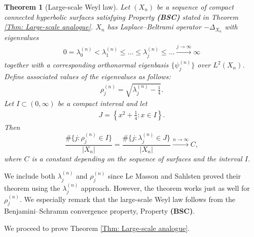 \documentclass[11pt,twoside,reqno]{amsart} \usepackage{a4wide} \usepackage[T1]{fontenc} \usepackage[utf8]{inputenc} \usepackage{soul}  \usepackage{amsmath} \usepackage{amsfonts} \usepackage{amssymb} \usepackage{mathtools} \usepackage{amsthm} \usepackage{xcolor} \usepackage{graphicx} \usepackage{hyperref} \usepackage{standalone} \usepackage{esint} \usepackage{comment} \usepackage[left=2.3cm,top=3cm,right=2.3cm]{geometry} \usepackage{bm} \usepackage{svg} \usepackage{float} \numberwithin{equation}{section} \theoremstyle{plain} \newtheorem{thm}{Theorem}[section] \newtheorem{theorem}[thm]{Theorem} \newtheorem*{theorem*}{Theorem}\newtheorem{conj}[thm]{Conjecture} \newtheorem{lemma}[thm]{Lemma} \newtheorem{prop}[thm]{Proposition} \newtheorem{proposition}[thm]{Proposition} \newtheorem{cor}[thm]{Corollary} \newtheorem{question}[thm]{Question} \newtheorem{corollary}[thm]{Corollary} \newtheorem{assumption}[thm]{Assumption} \theoremstyle{definition} \newtheorem{defn}[thm]{Definition} \newtheorem{choice}[thm]{Choice} \newtheorem{definition}[thm]{Definition} \newtheorem{ex}[thm]{Example} \newtheorem{notation}[thm]{Notation} \newtheorem*{ack}{Acknowledgements} \theoremstyle{remark} \newtheorem{remark}[thm]{Remark} \newtheorem{bigremark}[thm]{Remark} \usepackage{xcolor} \newcommand{\red}[1]{ {\color{Red}#1} } \newcommand{\blue}[1]{ {\color{Blue}#1} } \author{Kai Hippi} \address{Aalto University, Espoo, Finland} \email{kai.hippi@aalto.fi}
\begin{document}
\begin{theorem}[Large-scale Weyl law]
	\label{Thm: Weyl}
Let $(X_n)$ be a sequence of compact connected hyperbolic surfaces satisfying Property \textbf{(BSC)} stated in Theorem \ref{Thm: Large-scale analogue}. $ X_{n} $ has Laplace--Beltrami operator $ -\Delta_{X_{n}} $ with eigenvalues
\begin{align*}
	0 = \lambda_{0}^{( n )} < \lambda_{1}^{( n )} \leq \dots \leq \lambda_{j}^{( n )} \leq \dots \xrightarrow{j \to \infty} \infty
\end{align*}
together with a corresponding orthonormal eigenbasis $ \{ \psi_{j}^{( n )} \} $ over $ L^{2}( X_{n} ) $.
Define associated values of the eigenvalues as follows:
\begin{align*}
	\rho_{j}^{( n )} = \sqrt{ \lambda_{j}^{( n )} - \tfrac{1}{4} }.
\end{align*}
Let $ I \subset ( 0, \infty ) $ be a compact interval and let
\begin{align*}
	J = \left \{ x^{2} + \tfrac{1}{4} :  x \in I \right \}.
\end{align*}
Then
$$
\frac{ \# \{ j  :  \rho_{j}^{( n )} \in I \} }{|X_n|} = \frac{ \# \{  j  :  \lambda_{j}^{( n )} \in J \} }{ | X_{n} | } \xrightarrow{n \to \infty} C,
$$
where $ C $ is a constant depending on the sequence of surfaces and the interval $ I $.

\end{theorem}

We include both $ \lambda_{j}^{( n )} $ and $ \rho_{j}^{( n )} $ since Le Masson and Sahlsten proved their theorem using the $ \lambda_{j}^{( n )} $ approach. However, the theorem works just as well for $ \rho_{j}^{( n )} $. We especially remark that the large-scale Weyl law follows from the Benjamini--Schramm convergence property, Property \textbf{(BSC)}.

We proceed to prove Theorem \ref{Thm: Large-scale analogue}.
\end{document}
